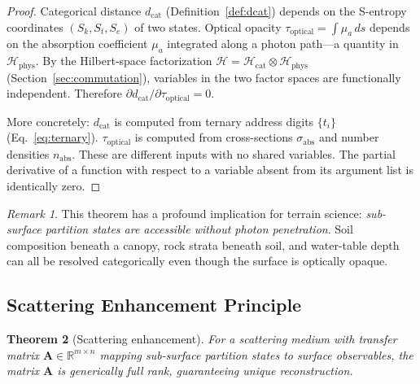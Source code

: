 \documentclass[10pt,twocolumn]{article}
\newtheorem{theorem}{Theorem}[section]
\theoremstyle{definition}
\theoremstyle{remark}
\newtheorem{remark}[theorem]{Remark}
\newcommand{\R}{\mathbb{R}}
\newcommand{\Hil}{\mathcal{H}}
\newcommand{\dcat}{d_{\mathrm{cat}}}
\newcommand{\topt}{\tau_{\mathrm{optical}}}
\newcommand{\Sk}{S_k}
\newcommand{\St}{S_t}
\newcommand{\Se}{S_e}
\begin{document}
\begin{proof}
Categorical distance $\dcat$ (Definition~\ref{def:dcat})
depends on the S-entropy coordinates $(\Sk,\St,\Se)$ of two
states.  Optical opacity $\topt = \int\mu_a\,ds$ depends on
the absorption coefficient $\mu_a$ integrated along a
photon path---a quantity in $\Hil_{\mathrm{phys}}$.  By the
Hilbert-space factorization
$\Hil=\Hil_{\mathrm{cat}}\otimes\Hil_{\mathrm{phys}}$
(Section~\ref{sec:commutation}), variables in the two factor
spaces are functionally independent.  Therefore
$\partial\dcat/\partial\topt = 0$.

More concretely: $\dcat$ is computed from ternary address
digits $\{t_i\}$ (Eq.~\ref{eq:ternary}).  $\topt$ is computed
from cross-sections $\sigma_{\mathrm{abs}}$ and number
densities $n_{\mathrm{abs}}$.  These are different inputs
with no shared variables.  The partial derivative of a function
with respect to a variable absent from its argument list is
identically zero.
\end{proof}

\begin{remark}
This theorem has a profound implication for terrain science:
\emph{sub-surface partition states are accessible without
photon penetration}.  Soil composition beneath a canopy, rock
strata beneath soil, and water-table depth can all be resolved
categorically even though the surface is optically opaque.
\end{remark}

\subsection{Scattering Enhancement Principle}
\label{sec:scattering}

\begin{theorem}[Scattering enhancement]\label{thm:scattering}
For a scattering medium with transfer matrix
$\mathbf{A}\in\R^{m\times n}$ mapping sub-surface partition
states to surface observables, the matrix $\mathbf{A}$ is
generically full rank, guaranteeing unique reconstruction.
\end{theorem}
\end{document}
